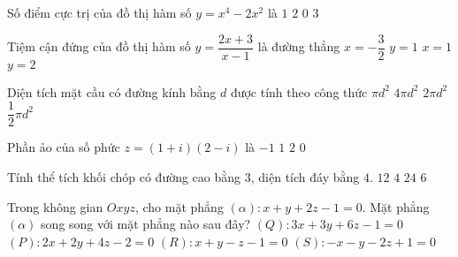 \begin{ex}%
Số điểm cực trị của đồ thị hàm số $y=x^4-2 x^2$ là
\choice
{$1$}
{$2$}
{$0$}
{\True $3$}
\end{ex}

\begin{ex}%
Tiệm cận đứng của đồ thị hàm số $y=\dfrac{2x+3}{x-1}$ là đường thẳng
\choice
{$x=-\dfrac{3}{2}$}
{$y=1$}
{\True $x=1$}
{$y=2$}
\end{ex}

\begin{ex}%
Diện tích mặt cầu có đường kính bằng $d$ được tính theo công thức
\choice
{\True $\pi d^2$}
{$4 \pi d^2$}
{$2 \pi d^2$}
{$\dfrac{1}{2}\pi d^2$}
\end{ex}

\begin{ex}%
Phần ảo của số phức $z=(1+i)(2-i)$ là
\choice
{$-1$}
{\True $1$}
{$2$}
{$0$}
\end{ex}

\begin{ex}%
Tính thể tích khối chóp có đường cao bằng $3$, diện tích đáy bằng $4$.
\choice
{$12$}
{\True $4$}
{$24$}
{$6$}
\end{ex}

\begin{ex}%
Trong không gian $O x y z$, cho mặt phẳng $(\alpha)\colon x+y+2 z-1=0$. Mặt phẳng $(\alpha)$ song song với mặt phẳng nào sau đây?
\choice
{\True $(Q)\colon 3x+3y+6z-1=0$}
{$(P)\colon 2x+2y+4z-2=0$}
{$(R)\colon x+y-z-1=0$}
{$(S)\colon-x-y-2z+1=0$}
\end{ex}

